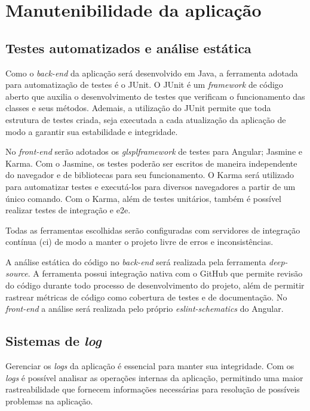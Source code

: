 \chapter{Manutenibilidade da aplicação}

\section{Testes automatizados e análise estática}


Como o \textit{\gls{back-end}} da aplicação será desenvolvido em Java, a ferramenta adotada para automatização de testes é o JUnit. O JUnit é um \textit{\gls{framework}} de código aberto que auxilia o desenvolvimento de testes que verificam o funcionamento das classes e seus métodos. Ademais, a utilização do JUnit permite que toda estrutura de testes criada, seja executada a cada atualização da aplicação  de modo a garantir sua estabilidade e integridade.


No \textit{\gls{front-end}} serão adotados os \textit{glspl{framework}} de testes para Angular; Jasmine e Karma. Com o Jasmine, os testes poderão ser escritos de maneira independente do navegador e de bibliotecas para seu funcionamento. O Karma será utilizado para automatizar testes e executá-los para diversos navegadores a partir de um único comando. Com o Karma, além de testes unitários, também é possível realizar testes de integração e \ac{e2e}.


Todas as ferramentas escolhidas serão configuradas com servidores de integração contínua (\ac{ci}) de modo a manter o projeto livre de erros e inconsistências.


A análise estática do código no \textit{\gls{back-end}} será realizada pela ferramenta \textit{\gls{deep-source}}. A ferramenta possui integração nativa com o GitHub que permite revisão do código durante todo processo de desenvolvimento do projeto, além de permitir rastrear métricas de código como cobertura de testes e de documentação. No \textit{front-end} a análise será realizada pelo próprio \textit{\gls{eslint-schematics}} do Angular.


\section{Sistemas de \textit{log}}
Gerenciar os \textit{\glspl{log}} da aplicação é essencial para manter sua integridade. Com os \textit{\glspl{log}} é possível analisar as operações internas da aplicação, permitindo uma maior rastreabilidade que fornecem informações necessárias para resolução de possíveis problemas na aplicação.


